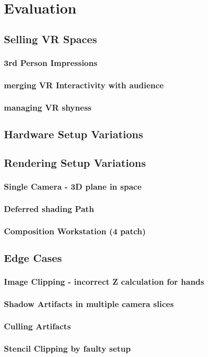 %
\chapter{Evaluation}

\section{Selling VR Spaces}
\subsection{3rd Person Impressions}
\subsection{merging VR Interactivity with audience}
\subsection{managing VR shyness}

\section{Hardware Setup Variations}

\section{Rendering Setup Variations}
\subsection{Single Camera - 3D plane in space}
\subsection{Deferred shading Path}
\subsection{Composition Workstation (4 patch)}

\section{Edge Cases}
\subsection{Image Clipping - incorrect Z calculation for hands}
\subsection{Shadow Artifacts in multiple camera slices}
\subsection{Culling Artifacts}
\subsection{Stencil Clipping by faulty setup}